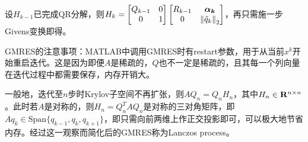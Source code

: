 \documentclass{ctexart}
\begin{document}
设$H_{k-1}$已完成QR分解，则$H_k=\begin{bmatrix}Q_{k-1}&0\\0&1\end{bmatrix}\begin{bmatrix}R_{k-1}&\bm{\alpha_k}\\0&\left\|\tilde{q}_k \right\|_2\end{bmatrix}$，再只需施一步Givens变换即得。

GMRES的注意事项：MATLAB中调用GMRES时有restart参数，用于从当前$x^k$开始重启迭代。这是因为即便$A$是稀疏的，$Q$也不一定是稀疏的，且其每一个列向量在迭代过程中都需要保存，内存开销大。

一般地，迭代至$n$步时Krylov子空间不再扩张，则$AQ_n=Q_nH_n$，其中$H_n\in \mathbf{R}^{n\times n}$。此时若$A$是对称的，则$H_n=Q_n^TAQ_n$是对称的三对角矩阵，即$Aq_k\in\mathrm{Span}\{q_{k-1},q_k,q_{k+1}\}$，即只需向前两维上作正交投影即可，可以极大地节省内存。经过这一观察而简化后的GMRES称为Lanczos process。
\end{document}
